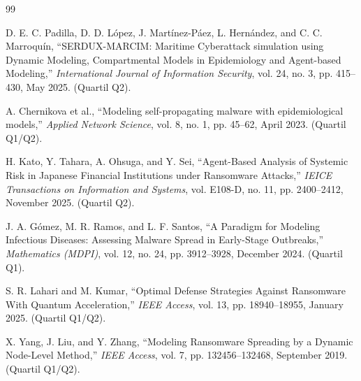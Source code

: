 \begin{thebibliography}{99}

D. E. C. Padilla, D. D. López, J. Martínez-Páez, L. Hernández, and C. C. Marroquín, 
``SERDUX-MARCIM: Maritime Cyberattack simulation using Dynamic Modeling, Compartmental Models in Epidemiology and Agent-based Modeling,'' 
\emph{International Journal of Information Security}, vol. 24, no. 3, pp. 415--430, May 2025. (Quartil Q2).

A. Chernikova et al., 
``Modeling self-propagating malware with epidemiological models,'' 
\emph{Applied Network Science}, vol. 8, no. 1, pp. 45--62, April 2023. (Quartil Q1/Q2).

H. Kato, Y. Tahara, A. Ohsuga, and Y. Sei, 
``Agent-Based Analysis of Systemic Risk in Japanese Financial Institutions under Ransomware Attacks,'' 
\emph{IEICE Transactions on Information and Systems}, vol. E108-D, no. 11, pp. 2400--2412, November 2025. (Quartil Q2).

J. A. Gómez, M. R. Ramos, and L. F. Santos,
``A Paradigm for Modeling Infectious Diseases: Assessing Malware Spread in Early-Stage Outbreaks,'' 
\emph{Mathematics (MDPI)}, vol. 12, no. 24, pp. 3912--3928, December 2024. (Quartil Q1).

S. R. Lahari and M. Kumar, 
``Optimal Defense Strategies Against Ransomware With Quantum Acceleration,'' 
\emph{IEEE Access}, vol. 13, pp. 18940--18955, January 2025. (Quartil Q1/Q2).

X. Yang, J. Liu, and Y. Zhang, 
``Modeling Ransomware Spreading by a Dynamic Node-Level Method,'' 
\emph{IEEE Access}, vol. 7, pp. 132456--132468, September 2019. (Quartil Q1/Q2).

\end{thebibliography}